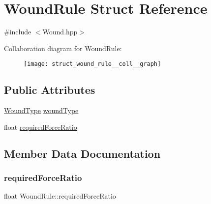 \hypertarget{struct_wound_rule}{}\section{Wound\+Rule Struct Reference}
\label{struct_wound_rule}


{\ttfamily \#include $<$Wound.\+hpp$>$}



Collaboration diagram for Wound\+Rule\+:
\nopagebreak
\begin{figure}[H]
\begin{center}
\leavevmode
\texttt{[image: struct\_wound\_rule\_\_coll\_\_graph]}
\end{center}
\end{figure}
\subsection*{Public Attributes}
\begin{DoxyCompactItemize}
\item 
\mbox{\hyperlink{_enum_types_8hpp_a585daaeecd1f9f1350c24bf0081a734e}{Wound\+Type}} \mbox{\hyperlink{struct_wound_rule_a839c23c859a5163785778a61a093970c}{wound\+Type}}
\item 
float \mbox{\hyperlink{struct_wound_rule_a7dd7ebd04b9692ca39b3914806f81b12}{required\+Force\+Ratio}}
\end{DoxyCompactItemize}


\subsection{Member Data Documentation}
\mbox{\label{struct_wound_rule_a7dd7ebd04b9692ca39b3914806f81b12}} 
\subsubsection{\texorpdfstring{required\+Force\+Ratio}{requiredForceRatio}}
{\footnotesize\ttfamily float Wound\+Rule\+::required\+Force\+Ratio}

\mbox{\label{struct_wound_rule_a839c23c859a5163785778a61a093970c}} 
